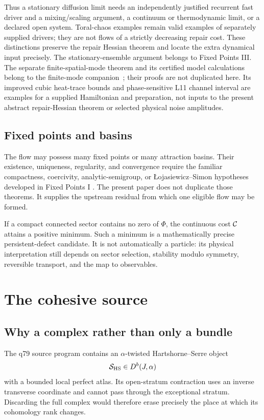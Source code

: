 \documentclass[11pt,a4paper]{article}
\newcommand{\HS}{\mathrm{HS}}
\begin{document}
Thus a stationary diffusion limit needs an independently justified
recurrent fast driver and a mixing/scaling argument, a continuum or
thermodynamic limit, or a declared open system. Toral-chaos examples remain
valid examples of separately supplied drivers; they are not flows of a
strictly decreasing repair cost. These distinctions preserve the repair
Hessian theorem and locate the extra dynamical input precisely. The
stationary-ensemble argument belongs to Fixed Points III. The separate
finite-spatial-mode theorem and its certified model calculations belong
to the finite-mode companion~\cite{MTTFiniteModeCompanion}; their proofs
are not duplicated here. Its improved cubic heat-trace bounds and
phase-sensitive L11 channel interval are examples for a supplied
Hamiltonian and preparation, not inputs to the present abstract
repair-Hessian theorem or selected physical noise amplitudes.

\subsection{Fixed points and basins}

The flow may possess many fixed points or many attraction basins.  Their
existence, uniqueness, regularity, and convergence require the familiar
compactness, coercivity, analytic-semigroup, or
\L{}ojasiewicz--Simon hypotheses developed in Fixed Points I
\cite{MTTFixedPointsI2026}.  The present paper does not duplicate those
theorems.  It supplies the upstream residual from which one eligible flow
may be formed.

If a compact connected sector contains no zero of \(\Phi\), the continuous
cost \(\mathcal{C}\) attains a positive minimum.  Such a minimum is a mathematically
precise persistent-defect candidate.  It is not automatically a particle:
its physical interpretation still depends on sector selection, stability
modulo symmetry, reversible transport, and the map to observables.

\section{The cohesive source}
\label{sec:cohesive}

\subsection{Why a complex rather than only a bundle}

The q79 source program contains an \(\alpha\)-twisted Hartshorne--Serre
object
\[
\calS_{\HS}\in D^b(J,\alpha)
\]
with a bounded local perfect atlas.  Its open-stratum contraction uses an
inverse transverse coordinate and cannot pass through the exceptional
stratum.  Discarding the full complex would therefore erase precisely the
place at which its cohomology rank changes.
\end{document}
